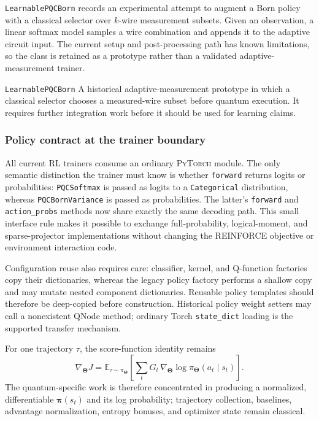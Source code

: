 \documentclass[10pt]{article}
\newcommand{\torch}{\textsc{PyTorch}}
\newcommand{\code}[1]{\texttt{#1}}
\newcommand{\E}{\mathbb{E}}
\begin{document}
\code{LearnablePQCBorn} records an experimental attempt to augment a Born
policy with a classical selector over $k$-wire measurement subsets.  Given an
observation, a linear softmax model samples a wire combination and appends it
to the adaptive circuit input.  The current setup and post-processing path has
known limitations, so the class is retained as a prototype rather than a
validated adaptive-measurement trainer.

\begin{qaspfeature}{\code{LearnablePQCBorn}}
A historical adaptive-measurement prototype in which a classical selector
chooses a measured-wire subset before quantum execution.  It requires further
integration work before it should be used for learning claims.
\end{qaspfeature}


\subsubsection{Policy contract at the trainer boundary}

All current RL trainers consume an ordinary \torch{} module.  The only
semantic distinction the trainer must know is whether \code{forward} returns
logits or probabilities: \code{PQCSoftmax} is passed as logits to a
\code{Categorical} distribution, whereas \code{PQCBornVariance} is passed as
probabilities.  The latter's \code{forward} and
\code{action\_probs} methods now share exactly the same decoding path.  This
small interface rule makes it possible to exchange full-probability,
logical-moment, and sparse-projector implementations without changing the
REINFORCE objective or environment interaction code.

Configuration reuse also requires care: classifier, kernel, and Q-function
factories copy their dictionaries, whereas the legacy policy factory performs
a shallow copy and may mutate nested component dictionaries.  Reusable policy
templates should therefore be deep-copied before construction.  Historical
policy weight setters may call a nonexistent QNode method; ordinary Torch
\code{state\_dict} loading is the supported transfer mechanism.

For one trajectory $\tau$, the score-function identity remains
\begin{equation}
  \nabla_{\bm\Theta}J
  =\E_{\tau\sim\pi_{\bm\Theta}}
   \left[\sum_t G_t\,
   \nabla_{\bm\Theta}\log\pi_{\bm\Theta}(a_t\mid s_t)\right].
  \label{eq:policy-gradient-identity}
\end{equation}
The quantum-specific work is therefore concentrated in producing a
normalized, differentiable $\bm\pi(s_t)$ and its log probability; trajectory
collection, baselines, advantage normalization, entropy bonuses, and optimizer
state remain classical.
\end{document}
